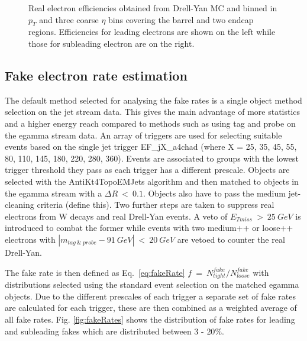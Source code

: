\begin{figure}[h]
\begin{center}
      \end{center}
   \caption{Real electron efficiencies obtained from Drell-Yan MC and binned in $p_{T}$ and three coarse $\eta$ bins covering the barrel and two endcap regions. Efficiencies for leading electrons are shown on the left while those for subleading electron are on the right.}
   \label{fig:realEff}
   \end{figure}



\subsection{Fake electron rate estimation}

The default method selected for analysing the fake rates is a single object method selection on the jet stream data. This gives the main advantage of more statistics and a higher energy reach compared to methods such as using tag and probe on the egamma stream data.
An array of triggers are used for selecting suitable events based on the single jet trigger EF\_jX\_a4chad (where X = 25, 35, 45, 55, 80, 110, 145, 180, 220, 280, 360). Events are associated to groups with the lowest trigger threshold they pass as each trigger has a different prescale. Objects are selected with the AntiKt4TopoEMJets algorithm and then matched to objects in the egamma stream with a $\Delta R~<~0.1$. Objects also have to pass the medium jet-cleaning criteria (define this). Two further steps are taken to suppress real electrons from W decays and real Drell-Yan events. A veto of $E_{Tmiss}~>~25~GeV$ is introduced to combat the former while events with two medium++ or loose++ electrons with $|m_{tag~\&~probe}-91~GeV|~<~20~GeV$ are vetoed to counter the real Drell-Yan.

The fake rate is then defined as Eq.~\ref{eq:fakeRate} $f~=~N^{fake}_{tight}/N^{fake}_{loose}$ with distributions selected using the standard event selection on the matched egamma objects.
Due to the different prescales of each trigger a separate set of fake rates are calculated for each trigger, these are then combined as a weighted average of all fake rates. Fig. \ref{fig:fakeRates} shows the distribution of fake rates for leading and subleading fakes which are distributed between 3 - $20\%$.


